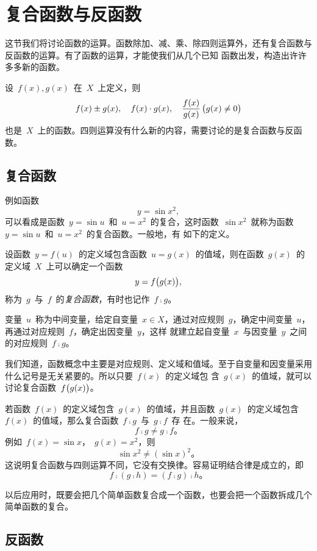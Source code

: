 \section{复合函数与反函数}

这节我们将讨论函数的运算。函数除加、减、乘、除四则运算外，还有复合函数与反函数的运算。有了函数的运算，才能使我们从几个已知
函数出发，构造出许许多多新的函数。

设~$f(x),g(x)$~在~$X$~上定义，则
\[
  f(x)\pm g(x),\quad f(x)\cdot g(x),\quad\frac{f(x)}{g(x)}\,\bigl\lparen g(x)\neq0\bigr\rparen
\]
也是~$X$~上的函数。四则运算没有什么新的内容，需要讨论的是复合函数与反函数。

\subsection{复合函数}

例如函数
\[
  y=\sin x^2,
\]
可以看成是函数~$y=\sin u$~和~$u=x^2$~的复合，这时函数~$\sin x^2$~就称为函数~$y=\sin u$~和~$u=x^2$~的复合函数。一般地，有
如下的定义。

\begin{definition}
设函数~$y=f(u)$~的定义域包含函数~$u=g(x)$~的值域，则在函数~$g(x)$~的定义域~$X$~上可以确定一个函数
\[
  y=f\bigl\lparen g(x)\bigr\rparen,
\]
称为~$g$~与~$f$~的\emph{复合函数}，有时也记作~$f\comp g$。
\end{definition}

变量~$u$~称为中间变量，给定自变量~$x\in X$，通过对应规则~$g$，确定中间变量~$u$，再通过对应规则~$f$，确定出因变量~$y$，这样
就建立起自变量~$x$~与因变量~$y$~之间的对应规则~$f\comp g$。

我们知道，函数概念中主要是对应规则、定义域和值域。至于自变量和因变量采用什么记号是无关紧要的。所以只要~$f(x)$~的定义域包
含~$g(x)$~的值域，就可以讨论复合函数~$f\bigl\lparen g(x)\bigr\rparen$。

若函数~$f(x)$~的定义域包含~$g(x)$~的值域，并且函数~$g(x)$~的定义域包含~$f(x)$~的值域，那么复合函数~$f\comp g$~与~$g\comp f$~存
在。一般来说，
\[
  f\comp g\neq g\comp f。
\]
例如~$f(x)=\sin x$，~$g(x)=x^2$，则
\[
  \sin x^2\neq(\sin x)^2。
\]
这说明复合函数与四则运算不同，它没有交换律。容易证明结合律是成立的，即
\[
  f\comp(g\comp h)=(f\comp g)\comp h。
\]

以后应用时，既要会把几个简单函数复合成一个函数，也要会把一个函数拆成几个简单函数的复合。


\subsection{反函数}

